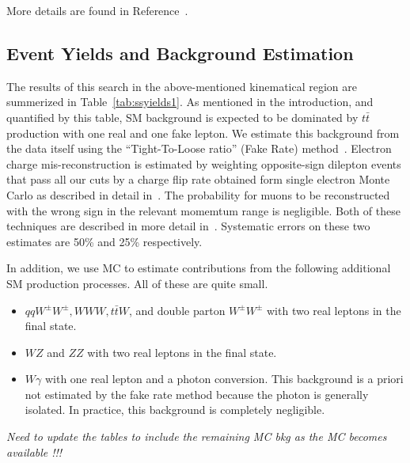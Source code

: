More details are found in Reference~\cite{ssnote2011}.

\subsection{Event Yields and Background Estimation}
\label{eventsel}

The results of this search in the above-mentioned kinematical region are summerized in Table~\ref{tab:ssyields1}.
As mentioned in the introduction, and quantified by this table, SM background is expected to be dominated by $t\bar{t}$ production
with one real and one fake lepton.
We estimate this background from the data itself using the ``Tight-To-Loose ratio'' (Fake Rate) method~\cite{frmethod}.
Electron charge mis-reconstruction is estimated by weighting opposite-sign dilepton events that pass all our cuts
by a charge flip rate obtained form single electron Monte Carlo as described in detail in~\cite{ssnote2011}.
The probability for muons to be reconstructed with the wrong sign in the relevant momemtum range is negligible.
Both of these techniques are described in more detail in~\cite{ssnote2011}.
Systematic errors on these two estimates are 50\% and 25\% respectively.

In addition, we use MC to estimate contributions from the following additional SM production processes.
All of these are quite small.

\begin{itemize}
\item $qqW^\pm W^\pm, WWW, t\bar{t}W$, and double parton $W^\pm W^\pm$ with two real leptons in the final state.
\item $WZ$ and $ZZ$ with two real leptons in the final state.
\item $W\gamma$ with one real lepton and a photon conversion. This background is a priori not estimated by the fake rate method
because the photon is generally isolated. In practice, this background is completely negligible.
\end{itemize}

{\it Need to update the tables to include the remaining MC bkg as the MC becomes available !!!}

